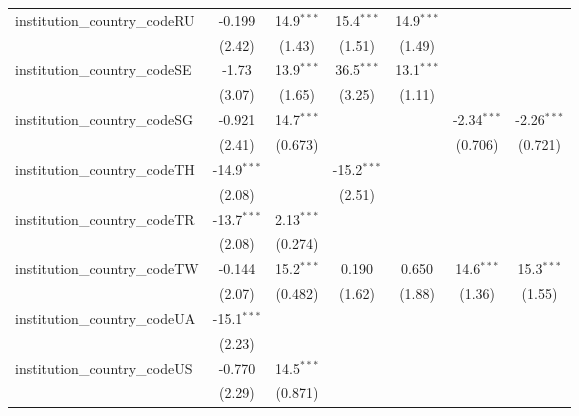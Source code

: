 \begin{tabular}{lcccccc}
   institution\_country\_codeRU          & -0.199        & 14.9$^{***}$  & 15.4$^{***}$  & 14.9$^{***}$  &               &   \\   
                                         & (2.42)        & (1.43)        & (1.51)        & (1.49)        &               &   \\   
   institution\_country\_codeSE          & -1.73         & 13.9$^{***}$  & 36.5$^{***}$  & 13.1$^{***}$  &               &   \\   
                                         & (3.07)        & (1.65)        & (3.25)        & (1.11)        &               &   \\   
   institution\_country\_codeSG          & -0.921        & 14.7$^{***}$  &               &               & -2.34$^{***}$ & -2.26$^{***}$\\   
                                         & (2.41)        & (0.673)       &               &               & (0.706)       & (0.721)\\   
   institution\_country\_codeTH          & -14.9$^{***}$ &               & -15.2$^{***}$ &               &               &   \\   
                                         & (2.08)        &               & (2.51)        &               &               &   \\   
   institution\_country\_codeTR          & -13.7$^{***}$ & 2.13$^{***}$  &               &               &               &   \\   
                                         & (2.08)        & (0.274)       &               &               &               &   \\   
   institution\_country\_codeTW          & -0.144        & 15.2$^{***}$  & 0.190         & 0.650         & 14.6$^{***}$  & 15.3$^{***}$\\   
                                         & (2.07)        & (0.482)       & (1.62)        & (1.88)        & (1.36)        & (1.55)\\   
   institution\_country\_codeUA          & -15.1$^{***}$ &               &               &               &               &   \\   
                                         & (2.23)        &               &               &               &               &   \\   
   institution\_country\_codeUS          & -0.770        & 14.5$^{***}$  &               &               &               &   \\   
                                         & (2.29)        & (0.871)       &               &               &               &   \\   

\end{tabular}
